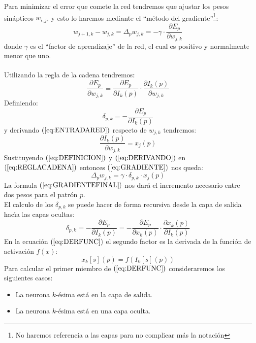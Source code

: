 Para minimizar el error que comete la red tendremos que ajustar los pesos
sin\'apticos $w_{i,j}$, y esto lo haremos mediante el
``m\'etodo del gradiente''\footnote{No haremos referencia a las capas para no
complicar m\'as la notaci\'on}:
\begin{equation}\label{eq:GRADIENTE}
w_{j+1,k}-w_{j,k}=\Delta_p w_{j,k}=- \gamma \cdot
\frac{\partial E_p}{\partial w_{j,k}}
\end{equation}
donde $\gamma$ es el ``factor de aprendizaje'' de la red, el cual es positivo y
normalmente menor que uno.\\ \\
%
Utilizando la regla de la cadena tendremos:
\begin{equation}\label{eq:REGLACADENA}
\frac{\partial E_p}{\partial w_{j,k}} = \frac{\partial E_p}{\partial I_k(p)}
\cdot \frac{\partial I_k(p)}{\partial w_{j,k}}
\end{equation}
Definiendo:
\begin{equation}\label{eq:DEFINICION}
\delta_{p,k} = -\frac{\partial E_p}{\partial I_k(p)}
\end{equation}
y derivando $(\ref{eq:ENTRADARED})$ respecto de $w_{j,k}$ tendremos:
\begin{equation}\label{eq:DERIVANDO}
\frac{\partial I_k(p)}{\partial w_{j,k}} = x_j(p)
\end{equation}
Sustituyendo $(\ref{eq:DEFINICION})$ y $(\ref{eq:DERIVANDO})$ en
$(\ref{eq:REGLACADENA})$ entonces $(\ref{eq:GRADIENTE})$ nos queda:
\begin{equation}\label{eq:GRADIENTEFINAL}
\Delta_p w_{j,k} = \gamma \cdot \delta_{p,k}\cdot x_j(p)
\end{equation}
La formula $(\ref{eq:GRADIENTEFINAL})$ nos dar\'a el incremento necesario entre
dos pesos para el patr\'on $p$.\\

El calculo de los $\delta_{p,k}$ se puede hacer de forma recursiva desde la capa
de salida hac\'{\i}a las capas ocultas:
\begin{equation}\label{eq:DERFUNC}
\delta_{p,k}=-\frac{\partial E_p}{\partial I_k(p)}=
-\frac{\partial E_p}{\partial x_k(p)}\cdot
\frac{\partial x_k(p)}{\partial I_k(p)}
\end{equation}
En la ecuaci\'on $(\ref{eq:DERFUNC})$ el segundo factor es la derivada de la
funci\'on de activaci\'on $f(x)$:
\begin{displaymath}
x_k[s](p) = f(I_k[s](p))
\end{displaymath}
Para calcular el primer miembro de $(\ref{eq:DERFUNC})$ consideraremos los
siguientes casos:
\begin{itemize}
\item La neurona $k$-\'esima est\'a en la capa de salida.
\item La neurona $k$-\'esima est\'a en una capa oculta.
\end{itemize}

